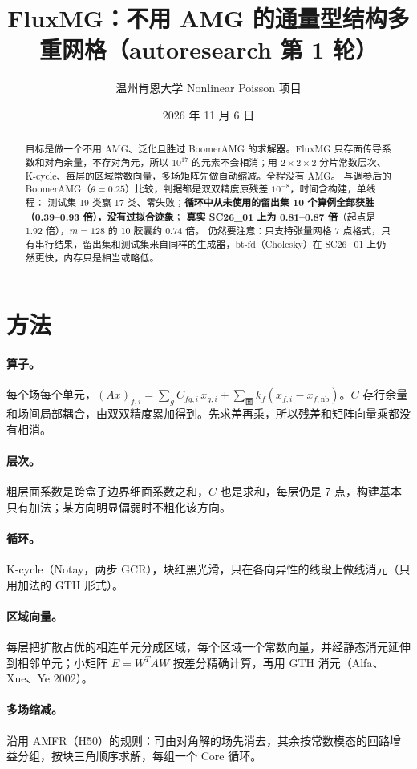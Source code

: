 \documentclass[11pt,a4paper]{ctexart}
\title{FluxMG：不用 AMG 的通量型结构多重网格（autoresearch 第 1 轮）}
\author{温州肯恩大学 \quad Nonlinear Poisson 项目}
\date{2026 年 11 月 6 日}
\begin{document}
\maketitle
\sloppy

\begin{abstract}
目标是做一个不用 AMG、泛化且胜过 BoomerAMG 的求解器。FluxMG 只存面传导系数和对角余量，不存对角元，所以 $10^{17}$ 的元素不会相消；用 $2\times2\times2$ 分片常数层次、K-cycle、每层的区域常数向量，多场矩阵先做自动缩减。全程没有 AMG。
与调参后的 BoomerAMG（$\theta=0.25$）比较，判据都是双双精度原残差 $10^{-8}$，时间含构建，单线程：
测试集 19 类赢 17 类、零失败；\textbf{循环中从未使用的留出集 10 个算例全部获胜（0.39--0.93 倍），没有过拟合迹象}；
\textbf{真实 SC26\_01 上为 0.81--0.87 倍}（起点是 1.92 倍），$m=128$ 的 10 胶囊约 0.74 倍。
仍然要注意：只支持张量网格 7 点格式，只有串行结果，留出集和测试集来自同样的生成器，bt-fd（Cholesky）在 SC26\_01 上仍然更快，内存只是相当或略低。
\end{abstract}

\section{方法}
\paragraph{算子。}每个场每个单元，$(Ax)_{f,i}=\sum_g C_{fg,i}\,x_{g,i}+\sum_{\text{面}} k_f(x_{f,i}-x_{f,\mathrm{nb}})$。$C$ 存行余量和场间局部耦合，由双双精度累加得到。先求差再乘，所以残差和矩阵向量乘都没有相消。
\paragraph{层次。}粗层面系数是跨盒子边界细面系数之和，$C$ 也是求和，每层仍是 7 点，构建基本只有加法；某方向明显偏弱时不粗化该方向。
\paragraph{循环。}K-cycle（Notay，两步 GCR），块红黑光滑，只在各向异性的线段上做线消元（只用加法的 GTH 形式）。
\paragraph{区域向量。}每层把扩散占优的相连单元分成区域，每个区域一个常数向量，并经静态消元延伸到相邻单元；小矩阵 $E=W^TAW$ 按差分精确计算，再用 GTH 消元（Alfa、Xue、Ye 2002）。
\paragraph{多场缩减。}沿用 AMFR（H50）的规则：可由对角解的场先消去，其余按常数模态的回路增益分组，按块三角顺序求解，每组一个 Core 循环。
\end{document}
